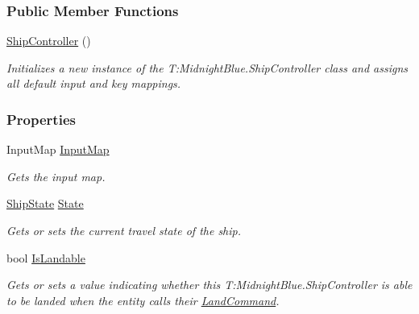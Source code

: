 \subsubsection*{Public Member Functions}
\begin{DoxyCompactItemize}
\item 
\hyperlink{class_midnight_blue_1_1_ship_controller_a07d38d2b98b9b132f1eff9cc8879f278}{Ship\+Controller} ()
\begin{DoxyCompactList}\small\item\em Initializes a new instance of the T\+:\+Midnight\+Blue.\+Ship\+Controller class and assigns all default input and key mappings. \end{DoxyCompactList}\end{DoxyCompactItemize}
\subsubsection*{Properties}
\begin{DoxyCompactItemize}
\item 
Input\+Map \hyperlink{class_midnight_blue_1_1_ship_controller_a50136c59b5a0e80d280aec4b6de46414}{Input\+Map}
\begin{DoxyCompactList}\small\item\em Gets the input map. \end{DoxyCompactList}\item 
\hyperlink{namespace_midnight_blue_a46fd3250d826e0dec67892328d5b368c}{Ship\+State} \hyperlink{class_midnight_blue_1_1_ship_controller_a032da447be3b66b7998349ae825d4edb}{State}
\begin{DoxyCompactList}\small\item\em Gets or sets the current travel state of the ship. \end{DoxyCompactList}\item 
bool \hyperlink{class_midnight_blue_1_1_ship_controller_ad07cfa737db5a712aedcc2528b953683}{Is\+Landable}
\begin{DoxyCompactList}\small\item\em Gets or sets a value indicating whether this T\+:\+Midnight\+Blue.\+Ship\+Controller is able to be landed when the entity calls their \hyperlink{class_midnight_blue_1_1_land_command}{Land\+Command}. \end{DoxyCompactList}\end{DoxyCompactItemize}


